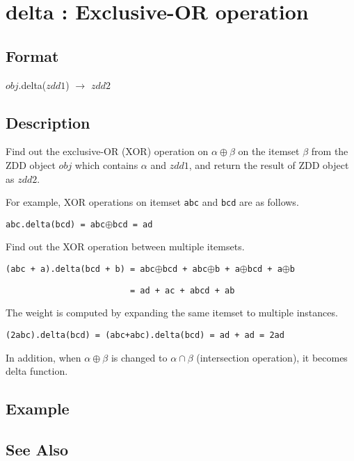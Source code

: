 
\section{delta : Exclusive-OR operation\label{sect:delta}}
\subsection*{Format}
$obj$.delta($zdd1$) $\rightarrow$ $zdd2$

\subsection*{Description}
Find out the exclusive-OR (XOR) operation on $\alpha \oplus \beta$ on the itemset $\beta$ from the ZDD object $obj$ which contains $\alpha$ and $zdd1$, and return the result of ZDD object as $zdd2$. 

For example, XOR operations on itemset \verb|abc| and \verb|bcd| are as follows. 

\verb|abc.delta(bcd) = abc|$\oplus$\verb|bcd = ad|

Find out the XOR operation between multiple itemsets. 

\verb|(abc + a).delta(bcd + b) = abc|$\oplus$\verb|bcd + abc|$\oplus$\verb|b + a|$\oplus$\verb|bcd + a|$\oplus$\verb|b|

\verb|                         = ad + ac + abcd + ab|

The weight is computed by expanding the same itemset to multiple instances. 

\verb|(2abc).delta(bcd) = (abc+abc).delta(bcd) = ad + ad = 2ad|

In addition, when $\alpha \oplus \beta$ is changed to $\alpha \cap \beta$ (intersection operation), it becomes delta function. 

\subsection*{Example}


\subsection*{See Also}

